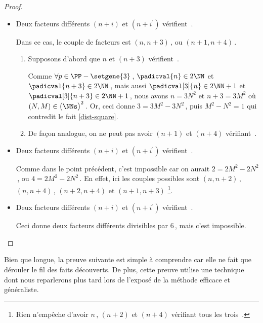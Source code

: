 \begin{proof}
\begin{itemize}
    	\item Deux facteurs différents $(n+i)$ et $(n+i^\prime)$ vérifient \,.
		
		\smallskip
		\noindent
		Dans ce cas, le couple de facteurs est $(n, n + 3)$\,, ou $(n + 1, n + 4)$\,.    
		\begin{enumerate}
			\item Supposons d'abord que $n$ et $(n+3)$ vérifient \,.
			
			\noindent
			Comme $\forall p \in \PP - \setgene{3}$\,, $\padicval{n} \in 2 \NN$ et $\padicval{n + 3} \in 2 \NN$\,,
			mais aussi $\padicval[3]{n} \in 2 \NN + 1$ et $\padicval[3]{n + 3} \in 2 \NN + 1$\,,
			nous avons $n = 3 N^2$ et $n+3 = 3 M^2$ où $(N, M) \in \big( \NNs \big)^2$\,.
			Or, ceci donne $3 = 3 M^2 - 3 N^2$\,, puis $M^2 - N^2 = 1$ qui contredit le fait \ref{dist-square}.

			\item De façon analogue, on ne peut pas avoir $(n+1)$ et $(n+4)$ vérifiant \,.
		\end{enumerate}


    	\item Deux facteurs différents $(n+i)$ et $(n+i^\prime)$ vérifient \,.
		
		\smallskip
		\noindent
		Comme dans le point précédent, c'est impossible car on aurait $2 = 2 M^2 - 2 N^2$\,, ou $4 = 2 M^2 - 2 N^2$\,. 
		En effet, ici les couples possibles sont $(n, n + 2)$\,, $(n, n + 4)$\,,  $(n + 2, n + 4)$ et $(n + 1, n + 3)$
		\footnote{
			Rien n'empêche d'avoir $n$\,, $(n + 2)$ et $(n + 4)$ vérifiant tous les trois \,.
		}.


    	\item Deux facteurs différents $(n+i)$ et $(n+i^\prime)$ vérifient \,.
		
		\smallskip
		\noindent
		Ceci donne deux facteurs différents divisibles par $6$\,, mais c'est impossible. \qedhere
    \end{itemize}
\end{proof}




Bien que longue, la preuve suivante est simple à comprendre car elle ne fait que dérouler le fil des faits découverts. 
De plus, cette preuve utilise une technique dont nous reparlerons plus tard lors de l'exposé de la méthode efficace et généraliste.


